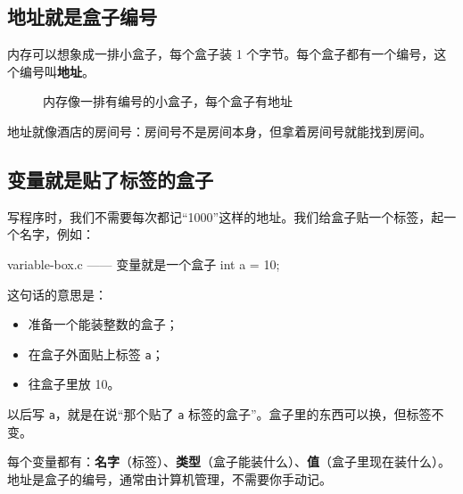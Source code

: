 \subsection{地址就是盒子编号}

内存可以想象成一排小盒子，每个盒子装 1 个字节。每个盒子都有一个编号，这个编号叫\textbf{地址}。

\begin{figure}[htbp]
  \centering
  \caption{内存像一排有编号的小盒子，每个盒子有地址}
  \label{fig:memory-boxes}
\end{figure}

地址就像酒店的房间号：房间号不是房间本身，但拿着房间号就能找到房间。

\subsection{变量就是贴了标签的盒子}

写程序时，我们不需要每次都记“1000”这样的地址。我们给盒子贴一个标签，起一个名字，例如：

\begin{codebox}{variable-box.c —— 变量就是一个盒子}
int a = 10;
\end{codebox}

这句话的意思是：

\begin{itemize}
  \item 准备一个能装整数的盒子；
  \item 在盒子外面贴上标签 \texttt{a}；
  \item 往盒子里放 10。
\end{itemize}

以后写 \texttt{a}，就是在说“那个贴了 \texttt{a} 标签的盒子”。盒子里的东西可以换，但标签不变。

\begin{tipbox}[变量三件事]
每个变量都有：\textbf{名字}（标签）、\textbf{类型}（盒子能装什么）、\textbf{值}（盒子里现在装什么）。地址是盒子的编号，通常由计算机管理，不需要你手动记。
\end{tipbox}

